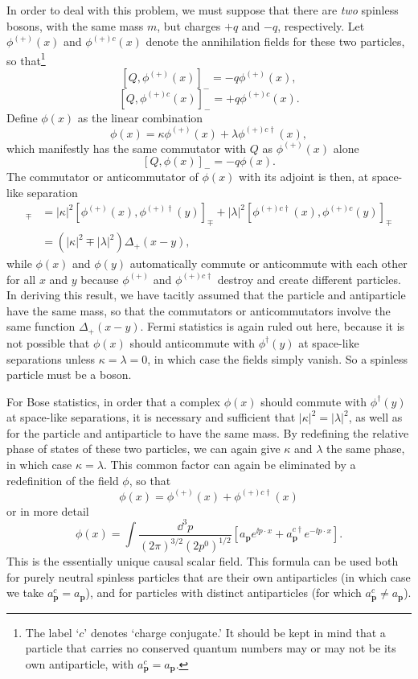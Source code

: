 In order to deal with this problem, we must suppose that there are
\textit{two} spinless bosons, with the same mass $m$, but charges $+q$ and
$-q$, respectively. Let $\phi^{(+)}(x)$ and $\phi^{(+)c}(x)$ denote the
annihilation fields for these two particles, so that\footnote{The label `$c$'
denotes `charge conjugate.' It should be kept in mind that a particle that
carries no conserved quantum numbers may or may not be its own antiparticle,
with $a^c_{\mathbf{p}}=a_{\mathbf{p}}$.}
\[
  [Q,\phi^{(+)}(x)]_-=-q\phi^{(+)}(x),
\]
\[
  [Q,\phi^{(+)c}(x)]_-=+q\phi^{(+)c}(x).
\]
Define $\phi(x)$ as the linear combination
\[
  \phi(x)=\kappa\phi^{(+)}(x)+\lambda\phi^{(+)c\dagger}(x),
\]
which manifestly has the same commutator with $Q$ as $\phi^{(+)}(x)$ alone
\[
  [Q,\phi(x)]_-=-q\phi(x).
\]
The commutator or anticommutator of $\phi(x)$ with its adjoint is then, at
space-like separation
\begin{align*}
  [\phi(x),\phi^\dagger(y)]_\mp
  & =|\kappa|^2[\phi^{(+)}(x),\phi^{(+)\dagger}(y)]_\mp
  +|\lambda|^2[\phi^{(+)c\dagger}(x),\phi^{(+)c}(y)]_\mp
  \\
  & =(|\kappa|^2\mp|\lambda|^2)\Delta_+(x-y),
\end{align*}
while $\phi(x)$ and $\phi(y)$ automatically commute or anticommute with each
other for all $x$ and $y$ because $\phi^{(+)}$ and $\phi^{(+)c\dagger}$ destroy
and create different particles. In deriving this result, we have tacitly
assumed that the particle and antiparticle have the same mass, so that the
commutators or anticommutators involve the same function $\Delta_+(x-y)$.
Fermi statistics is again ruled out here, because it is not possible that
$\phi(x)$ should anticommute with $\phi^\dagger(y)$ at space-like separations
unless $\kappa=\lambda=0$, in which case the fields simply vanish. So a
spinless particle must be a boson.

For Bose statistics, in order that a complex $\phi(x)$ should commute with
$\phi^\dagger(y)$ at space-like separations, it is necessary and sufficient
that $|\kappa|^2=|\lambda|^2$, as well as for the particle and antiparticle to
have the same mass. By redefining the relative phase of states of these two
particles, we can again give $\kappa$ and $\lambda$ the same phase, in which
case $\kappa=\lambda$. This common factor can again be eliminated by a
redefinition of the field $\phi$, so that
\[
  \phi(x)=\phi^{(+)}(x)+\phi^{(+)c\dagger}(x)
\]
or in more detail
\begin{equation}
  \phi(x)=\int\frac{\dd^3p}{(2\pi)^{3/2}(2p^0)^{1/2}}
  \left[a_{\mathbf{p}}e^{\ii p\cdot x}
  +a^{c\dagger}_{\mathbf{p}}e^{-\ii p\cdot x}\right].
  \tag{5.2.11}\label{eq:5.2.11}
\end{equation}
This is the essentially unique causal scalar field. This formula can be used
both for purely neutral spinless particles that are their own antiparticles
(in which case we take $a^c_{\mathbf{p}}=a_{\mathbf{p}}$), and for particles with
distinct antiparticles (for which $a^c_{\mathbf{p}}\ne a_{\mathbf{p}}$).

